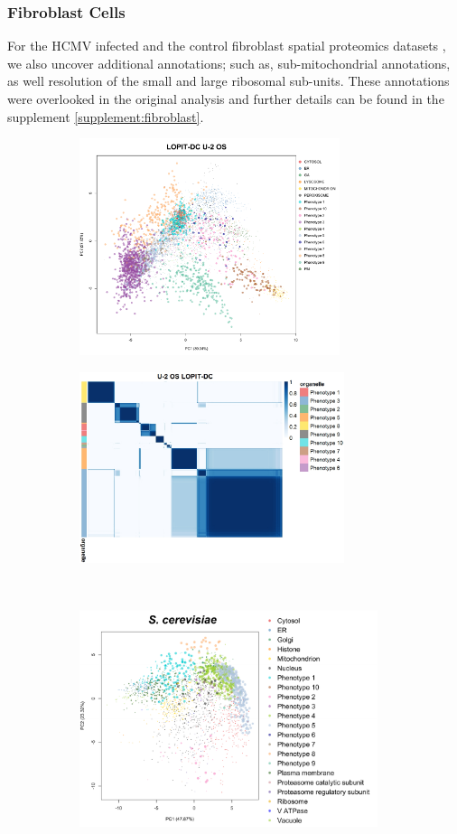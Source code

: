 \documentclass[12pt,english]{article}
\begin{document}
\subsubsection{Fibroblast Cells}
For the HCMV infected and the control fibroblast spatial proteomics datasets \citep{Jean_Beltran:2016}, we also uncover additional annotations; such as, sub-mitochondrial annotations, as well resolution of the small and large ribosomal sub-units. These annotations were overlooked in the original analysis \citep{Jean_Beltran:2016} and further details can be found in the supplement \ref{supplement:fibroblast}.
 
\begin{figure}
	\begin{subfigure}[t]{0.5\textwidth}
	\centering
	\includegraphics[height=2.5in]{pcau2osdc.pdf}
	\caption{}
\end{subfigure}
\begin{subfigure}[t]{0.5\textwidth}
	\centering
	\includegraphics[height=2.2in]{heatmapU2osdc.jpeg}
	\caption{}
\end{subfigure}
~
\begin{subfigure}[t]{0.5\textwidth}
	\centering
	\includegraphics[height=2.5in]{pcaYeast.pdf}

\end{subfigure}
\end{figure}
\end{document}
